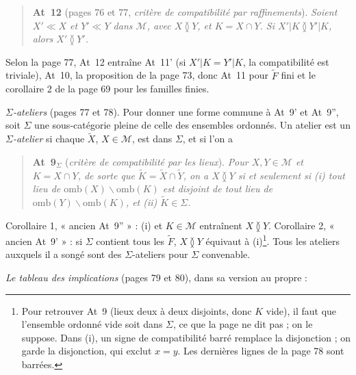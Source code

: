 \documentclass[11pt,a4paper]{article}
\begin{document}
\begin{quote}
\textbf{At~12} (pages 76 et 77, \emph{critère de compatibilité par raffinements}).
\emph{Soient $X' \ll X$ et $Y' \ll Y$ dans $\mathcal{M}$, avec $X \between Y$, et
$K = X \cap Y$. Si $X'|K \between Y'|K$, alors $X' \between Y'$.}
\end{quote}

Selon la page 77, At~12 entraîne At~11' (si $X'|K = Y'|K$, la compatibilité est triviale), At~10,
la proposition de la page 73, donc At~11 pour $\widetilde{F}$ fini et le
corollaire 2 de la page 69 pour les familles finies.

\emph{$\Sigma$-ateliers} (pages 77 et 78). Pour donner une forme commune à At~9'
et At~9'', soit $\Sigma$ une sous-catégorie pleine de celle des ensembles
ordonnés. Un atelier est un \emph{$\Sigma$-atelier} si chaque $\widetilde{X}$, $X
\in \mathcal{M}$, est dans $\Sigma$, et si l'on a

\begin{quote}
\textbf{At~9$_{\Sigma}$} (\emph{critère de compatibilité par les lieux}).
\emph{Pour $X, Y \in \mathcal{M}$ et $K = X \cap Y$, de sorte que $\widetilde{K} =
\widetilde{X} \cap \widetilde{Y}$, on a $X \between Y$ si et seulement si (i) tout
lieu de $\mathrm{omb}(X) \smallsetminus \mathrm{omb}(K)$ est disjoint de tout lieu
de $\mathrm{omb}(Y) \smallsetminus \mathrm{omb}(K)$, et (ii) $\widetilde{K} \in
\Sigma$.}
\end{quote}

Corollaire 1, « ancien At~9'' » : (i) et $K \in \mathcal{M}$ entraînent $X \between
Y$. Corollaire 2, « ancien At~9' » : si $\Sigma$ contient tous les
$\widetilde{F}$, $X \between Y$ équivaut à (i)\footnote{Pour retrouver At~9
(lieux deux à deux disjoints, donc $K$ vide), il faut que l'ensemble ordonné vide
soit dans $\Sigma$, ce que la page ne dit pas ; on le suppose. Dans (i), un signe
de compatibilité barré remplace la disjonction ; on garde la disjonction, qui
exclut $x = y$. Les dernières lignes de la page 78 sont barrées.}. Tous les
ateliers auxquels il a songé sont des $\Sigma$-ateliers pour $\Sigma$ convenable.

\emph{Le tableau des implications} (pages 79 et 80), dans sa version au propre :

\end{document}
